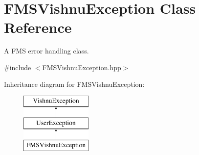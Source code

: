 \hypertarget{classFMSVishnuException}{
\section{FMSVishnuException Class Reference}
\label{classFMSVishnuException}
}


A FMS error handling class.  




{\ttfamily \#include $<$FMSVishnuException.hpp$>$}

Inheritance diagram for FMSVishnuException:\begin{figure}[H]
\begin{center}
\leavevmode
\includegraphics[height=3.000000cm]{classFMSVishnuException}
\end{center}
\end{figure}
